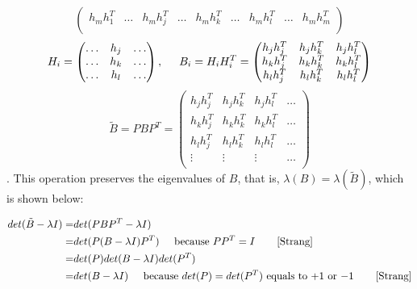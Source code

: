 {\[\begin{pmatrix}
  h_{m}h^{T}_{1} & \hdots & h_{m}h^{T}_{j} & \hdots & h_{m}h^{T}_{k} & \hdots & h_{m}h^{T}_{l} & \hdots & h_{m}h^{T}_{m}  \\
 \end{pmatrix}
\]
\vspace{0.5cm}
\[
 H_{i} =
 \begin{pmatrix}
  \hdots & h_{j} & \hdots \\
  \hdots & h_{k} & \hdots \\
  \hdots & h_{l} & \hdots \\  
 \end{pmatrix}, \hspace{0.5cm}
 B_{i} = H_{i}H_{i}^{T} = 
 \begin{pmatrix}
  h_{j}h^{T}_{j} & h_{j}h^{T}_{k} & h_{j}h^{T}_{l}  \\
  h_{k}h^{T}_{j} & h_{k}h^{T}_{k} & h_{k}h^{T}_{l}   \\                 
  h_{l}h^{T}_{j} & h_{l}h^{T}_{k} & h_{l}h^{T}_{l}  \\
 \end{pmatrix}
\]
\vspace{0.5cm}
\[
 \tilde{B} = PBP^{T} = 
 \begin{pmatrix}
  h_{j}h^{T}_{j} & h_{j}h^{T}_{k} & h_{j}h^{T}_{l} & \hdots  \\
  h_{k}h^{T}_{j} & h_{k}h^{T}_{k} & h_{k}h^{T}_{l} & \hdots  \\
  h_{l}h^{T}_{j} & h_{l}h^{T}_{k} & h_{l}h^{T}_{l} & \hdots  \\
   \vdots        &    \vdots      &   \vdots       & \hdots  \\
 \end{pmatrix}
\]
}. This operation preserves the eigenvalues of $B$, that is, $\lambda(B)=\lambda(\tilde{B})$, which is shown below:

\begin{equation}\label{EigPres}
\begin{aligned}
det(\tilde{B}-\lambda I) = & det(PBP^{T}-\lambda I) \\
                         = & det(P(B-\lambda I)P^{T}) \hspace{0.5cm} \text{because $PP^{T}=I$ \hspace{0.5cm} \cite{Strang}} \\
                         = & det(P) det(B-\lambda I) det(P^{T}) \\
                         = & det(B-\lambda I) \hspace{0.5cm} \text{because $det(P)=det(P^{T})$ equals to $+1$ or $-1$ \hspace{0.5cm} \cite{Strang}}
\end{aligned}
\end{equation}


